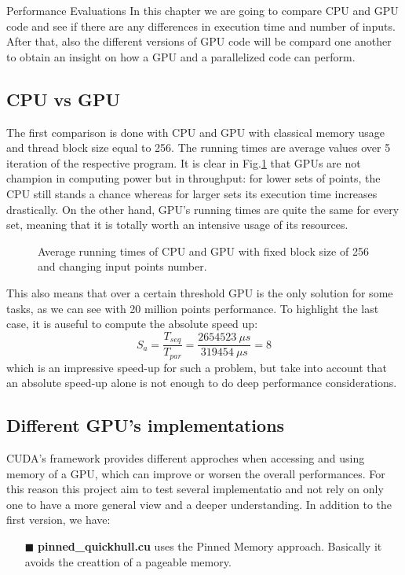 \documentclass[a4paper,oneside,11pt,DIV12,headsepline,footexclude,headexclude]{scrartcl}
\begin{document}
\begin{section}{Performance Evaluations}
In this chapter we are going to compare CPU and GPU code and see if there are any differences in execution time and number of inputs. After that, also the different versions of GPU code will be compard one another to obtain an insight on how a GPU and a parallelized code can perform.
\subsection{CPU vs GPU}
The first comparison is done with CPU and GPU with classical memory usage and thread block size equal to 256. The running times are average values over 5 iteration of the respective program. It is clear in Fig.\ref{cpuvsgpu} that GPUs are not champion in computing power but in throughput: for lower sets of points, the CPU still stands a chance whereas for larger sets its execution time increases drastically. On the other hand, GPU's running times are quite the same for every set, meaning that it is totally worth an intensive usage of its resources.
\begin{figure}[H]
    \centering
    
    \caption{Average running times of CPU and GPU with fixed block size of 256 and changing input points number.}
    \label{cpuvsgpu}
\end{figure}
This also means that over a certain threshold GPU is the only solution for some tasks, as we can see with 20 million points performance.
To highlight the last case, it is auseful to compute the absolute speed up:
\begin{equation*}
    S_{a}=\frac{T_{seq}}{T_{par}}=\frac{2654523\ \mu s}{319454\ \mu s}=8
\end{equation*}
which is an impressive speed-up for such a problem, but take into account that an absolute speed-up alone is not enough to do deep performance considerations.
\subsection{Different GPU's implementations}
CUDA's framework provides different approches when accessing and using memory of a GPU, which can improve or worsen the overall performances. For this reason this project aim to test several implementatio and not rely on only one to have a more general view and a deeper understanding. In addition to the first version, we have:
\begin{enumerate}
    \item[$\blacksquare$] \textbf{pinned\_quickhull.cu} uses the Pinned Memory approach. Basically it avoids the creattion of a pageable memory.


\end{enumerate}
\end{section}
\end{document}
